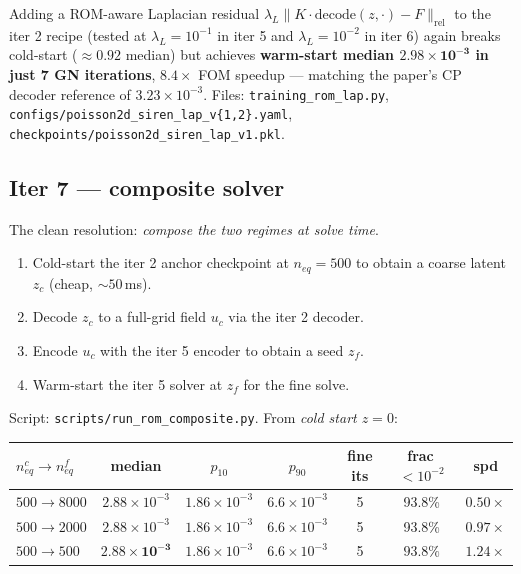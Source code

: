 \documentclass[11pt]{article}
\begin{document}
Adding a ROM-aware Laplacian residual
$\lambda_L \|K \cdot \text{decode}(z, \cdot) - F\|_{\text{rel}}$
to the iter 2 recipe (tested at $\lambda_L=10^{-1}$ in iter 5 and
$\lambda_L=10^{-2}$ in iter 6) again breaks cold-start ($\approx
0.92$ median) but achieves \textbf{warm-start median $\mathbf{2.98
\times 10^{-3}}$ in just 7 GN iterations}, $8.4\times$ FOM speedup ---
matching the paper's CP decoder reference of $3.23\times 10^{-3}$.
Files: \texttt{training\_rom\_lap.py},
\texttt{configs/poisson2d\_siren\_lap\_v\{1,2\}.yaml},
\texttt{checkpoints/poisson2d\_siren\_lap\_v1.pkl}.

\subsection{Iter 7 --- composite solver}

The clean resolution: \emph{compose the two regimes at solve time}.
\begin{enumerate}
\item Cold-start the iter 2 anchor checkpoint at $n_{eq}=500$ to obtain
      a coarse latent $z_c$ (cheap, $\sim 50$\,ms).
\item Decode $z_c$ to a full-grid field $u_c$ via the iter 2 decoder.
\item Encode $u_c$ with the iter 5 encoder to obtain a seed $z_f$.
\item Warm-start the iter 5 solver at $z_f$ for the fine solve.
\end{enumerate}
Script: \texttt{scripts/run\_rom\_composite.py}. From \emph{cold start
$z=0$}:

\begin{center}
\begin{tabular}{lcccccc}
\toprule
$n_{eq}^c \to n_{eq}^f$ & median & $p_{10}$ & $p_{90}$ & fine its & frac\,$<10^{-2}$ & spd \\
\midrule
$500 \to 8000$ & $2.88\!\times\!10^{-3}$ & $1.86\!\times\!10^{-3}$ & $6.6\!\times\!10^{-3}$ & 5 & 93.8\% & $0.50\times$ \\
$500 \to 2000$ & $2.88\!\times\!10^{-3}$ & $1.86\!\times\!10^{-3}$ & $6.6\!\times\!10^{-3}$ & 5 & 93.8\% & $0.97\times$ \\
$500 \to 500$  & $\mathbf{2.88\!\times\!10^{-3}}$ & $1.86\!\times\!10^{-3}$ & $6.6\!\times\!10^{-3}$ & 5 & $\mathbf{93.8\%}$ & $\mathbf{1.24\times}$ \\
\bottomrule
\end{tabular}
\end{center}
\end{document}
